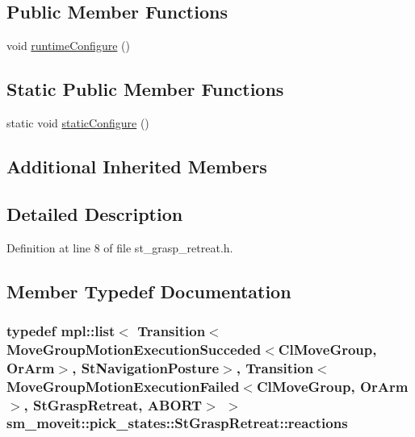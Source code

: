 \subsection*{Public Member Functions}
\begin{DoxyCompactItemize}
\item 
void \hyperlink{structsm__moveit_1_1pick__states_1_1StGraspRetreat_a1a712867a1888f96a82f19d6ccfb2a76}{runtime\+Configure} ()
\end{DoxyCompactItemize}
\subsection*{Static Public Member Functions}
\begin{DoxyCompactItemize}
\item 
static void \hyperlink{structsm__moveit_1_1pick__states_1_1StGraspRetreat_ae80fb9ae04a037851deaa7df277dcfe8}{static\+Configure} ()
\end{DoxyCompactItemize}
\subsection*{Additional Inherited Members}


\subsection{Detailed Description}


Definition at line 8 of file st\+\_\+grasp\+\_\+retreat.\+h.



\subsection{Member Typedef Documentation}
\subsubsection[{\texorpdfstring{reactions}{reactions}}]{\setlength{\rightskip}{0pt plus 5cm}typedef mpl\+::list$<$ Transition$<${\bf Move\+Group\+Motion\+Execution\+Succeded}$<${\bf Cl\+Move\+Group}, {\bf Or\+Arm}$>$, {\bf St\+Navigation\+Posture}$>$, Transition$<${\bf Move\+Group\+Motion\+Execution\+Failed}$<${\bf Cl\+Move\+Group}, {\bf Or\+Arm}$>$, {\bf St\+Grasp\+Retreat}, {\bf A\+B\+O\+RT}$>$ $>$ {\bf sm\+\_\+moveit\+::pick\+\_\+states\+::\+St\+Grasp\+Retreat\+::reactions}}\hypertarget{structsm__moveit_1_1pick__states_1_1StGraspRetreat_a8cb7952472046718830fb75585f0d11a}{}\label{structsm__moveit_1_1pick__states_1_1StGraspRetreat_a8cb7952472046718830fb75585f0d11a}


